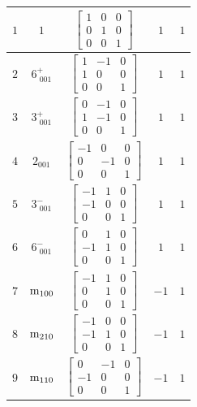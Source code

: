 \documentclass[fleqn,8pt]{jsarticle}
\begin{document}
\begin{longtable}{ccccc}
$ 1 $ & $ 1 $ & $ \begin{bmatrix} 1 & 0 & 0 \\ 0 & 1 & 0 \\ 0 & 0 & 1 \end{bmatrix} $ & $ 1 $ & $ 1 $ \\ \hline
$ 2 $ & $ 6^{+}_{\,\,001} $ & $ \begin{bmatrix} 1 & -1 & 0 \\ 1 & 0 & 0 \\ 0 & 0 & 1 \end{bmatrix} $ & $ 1 $ & $ 1 $ \\ \hline
$ 3 $ & $ 3^{+}_{\,\,001} $ & $ \begin{bmatrix} 0 & -1 & 0 \\ 1 & -1 & 0 \\ 0 & 0 & 1 \end{bmatrix} $ & $ 1 $ & $ 1 $ \\ \hline
$ 4 $ & $ 2{}_{001} $ & $ \begin{bmatrix} -1 & 0 & 0 \\ 0 & -1 & 0 \\ 0 & 0 & 1 \end{bmatrix} $ & $ 1 $ & $ 1 $ \\ \hline
$ 5 $ & $ 3^{-}_{\,\,001} $ & $ \begin{bmatrix} -1 & 1 & 0 \\ -1 & 0 & 0 \\ 0 & 0 & 1 \end{bmatrix} $ & $ 1 $ & $ 1 $ \\ \hline
$ 6 $ & $ 6^{-}_{\,\,001} $ & $ \begin{bmatrix} 0 & 1 & 0 \\ -1 & 1 & 0 \\ 0 & 0 & 1 \end{bmatrix} $ & $ 1 $ & $ 1 $ \\ \hline
$ 7 $ & $ {\rm m}_{100} $ & $ \begin{bmatrix} -1 & 1 & 0 \\ 0 & 1 & 0 \\ 0 & 0 & 1 \end{bmatrix} $ & $ -1 $ & $ 1 $ \\ \hline
$ 8 $ & $ {\rm m}_{210} $ & $ \begin{bmatrix} -1 & 0 & 0 \\ -1 & 1 & 0 \\ 0 & 0 & 1 \end{bmatrix} $ & $ -1 $ & $ 1 $ \\ \hline
$ 9 $ & $ {\rm m}_{110} $ & $ \begin{bmatrix} 0 & -1 & 0 \\ -1 & 0 & 0 \\ 0 & 0 & 1 \end{bmatrix} $ & $ -1 $ & $ 1 $ \\ \hline

\end{longtable}
\end{document}
